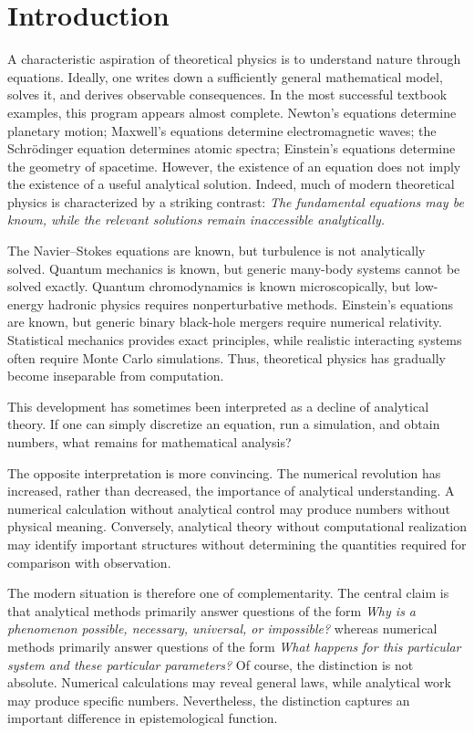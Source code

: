 \section{ Introduction}
A characteristic aspiration of theoretical physics is to understand nature
through equations. Ideally, one writes down a sufficiently general mathematical
model, solves it, and derives observable consequences. In the most successful
textbook examples, this program appears almost complete. Newton's equations
determine planetary motion; Maxwell's equations determine electromagnetic
waves; the Schrödinger equation determines atomic spectra; Einstein's equations
determine the geometry of spacetime.
However, the existence of an equation does not imply the existence of a useful analytical solution.
Indeed, much of modern theoretical physics is characterized by a striking contrast:
\emph{The fundamental equations may be known, while the relevant solutions remain inaccessible analytically.}

The Navier--Stokes equations are known, but turbulence is not analytically
solved. Quantum mechanics is known, but generic many-body systems cannot be
solved exactly. Quantum chromodynamics is known microscopically, but low-energy
hadronic physics requires nonperturbative methods. Einstein's equations are
known, but generic binary black-hole mergers require numerical relativity.
Statistical mechanics provides exact principles, while realistic interacting
systems often require Monte Carlo simulations.
Thus, theoretical physics has gradually become inseparable from computation.

This development has sometimes been interpreted as a decline of analytical
theory. If one can simply discretize an equation, run a simulation, and obtain
numbers, what remains for mathematical analysis?

The opposite interpretation is more convincing. The numerical revolution has
increased, rather than decreased, the importance of analytical understanding. A
numerical calculation without analytical control may produce numbers without
physical meaning. Conversely, analytical theory without computational
realization may identify important structures without determining the
quantities required for comparison with observation.

The modern situation is therefore one of complementarity.
The central claim is that analytical methods primarily answer questions of the form
\emph{Why is a phenomenon possible, necessary, universal, or impossible?}
whereas numerical methods primarily answer questions of the form
\emph{What happens for this particular system and these particular parameters?}
Of course, the distinction is not absolute. Numerical calculations may reveal
general laws, while analytical work may produce specific numbers. Nevertheless,
the distinction captures an important difference in epistemological function.

